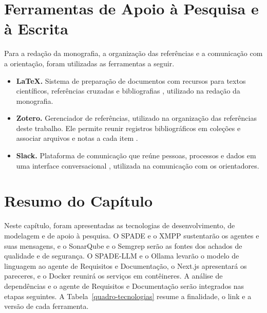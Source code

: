 \section{Ferramentas de Apoio à Pesquisa e à Escrita}
\label{st-tcc}

Para a redação da monografia, a organização das referências e a comunicação com a orientação, foram utilizadas as ferramentas a seguir.

\begin{itemize}
\item \textbf{LaTeX.} Sistema de preparação de documentos com recursos para textos científicos, referências cruzadas e bibliografias \cite{latexProject}, utilizado na redação da monografia.
\item \textbf{Zotero.} Gerenciador de referências, utilizado na organização das referências deste trabalho. Ele permite reunir registros bibliográficos em coleções e associar arquivos e notas a cada item \cite{zoteroGuide}.
\item \textbf{Slack.} Plataforma de comunicação que reúne pessoas, processos e dados em uma interface conversacional \cite{slackWhatIs}, utilizada na comunicação com os orientadores.
\end{itemize}

\section{Resumo do Capítulo}
\label{st-resumo}

Neste capítulo, foram apresentadas as tecnologias de desenvolvimento, de modelagem e de apoio à pesquisa. O SPADE e o XMPP sustentarão os agentes e suas mensagens, e o SonarQube e o Semgrep serão as fontes dos achados de qualidade e de segurança. O SPADE-LLM e o Ollama levarão o modelo de linguagem ao agente de Requisitos e Documentação, o Next.js apresentará os pareceres, e o Docker reunirá os serviços em contêineres. A análise de dependências e o agente de Requisitos e Documentação serão integrados nas etapas seguintes. A Tabela~\ref{quadro-tecnologias} resume a finalidade, o link e a versão de cada ferramenta.

